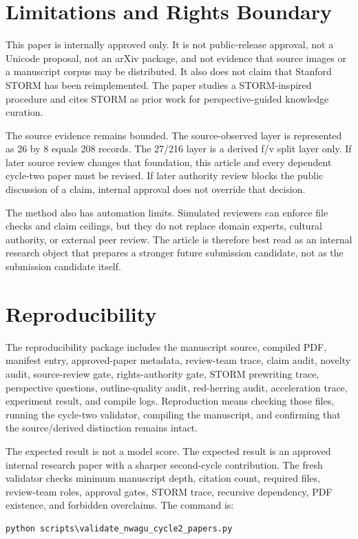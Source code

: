 \documentclass[sigconf,nonacm]{acmart}
\begin{document}
\section{Limitations and Rights Boundary}
This paper is internally approved only. It is not public-release approval, not a
Unicode proposal, not an arXiv package, and not evidence that source images or a
manuscript corpus may be distributed. It also does not claim that Stanford STORM
has been reimplemented. The paper studies a STORM-inspired procedure and cites
STORM as prior work for perspective-guided knowledge curation.

The source evidence remains bounded. The source-observed layer is represented as
26 by 8 equals 208 records. The 27/216 layer is a derived f/v split layer only.
If later source review changes that foundation, this article and every
dependent cycle-two paper must be revised. If later authority review blocks the
public discussion of a claim, internal approval does not override that decision.

The method also has automation limits. Simulated reviewers can enforce file
checks and claim ceilings, but they do not replace domain experts, cultural
authority, or external peer review. The article is therefore best read as an
internal research object that prepares a stronger future submission candidate,
not as the submission candidate itself.

\section{Reproducibility}
The reproducibility package includes the manuscript source, compiled PDF,
manifest entry, approved-paper metadata, review-team trace, claim audit,
novelty audit, source-review gate, rights-authority gate, STORM prewriting
trace, perspective questions, outline-quality audit, red-herring audit,
acceleration trace, experiment result, and compile logs. Reproduction means
checking those files, running the cycle-two validator, compiling the manuscript,
and confirming that the source/derived distinction remains intact.

The expected result is not a model score. The expected result is an approved
internal research paper with a sharper second-cycle contribution. The fresh
validator checks minimum manuscript depth, citation count, required files,
review-team roles, approval gates, STORM trace, recursive dependency, PDF
existence, and forbidden overclaims. The command is:
\begin{verbatim}
python scripts\validate_nwagu_cycle2_papers.py
\end{verbatim}
\end{document}
